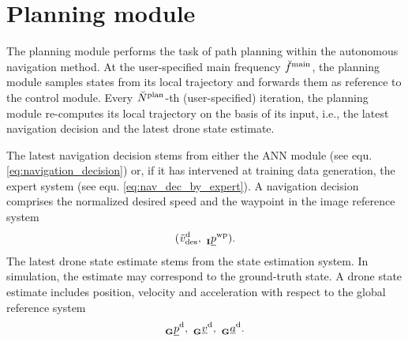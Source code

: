 \section{Planning module}
The planning module performs the task of path planning
within the autonomous navigation method.
At the user-specified main frequency 
$\freq[\user]{\main}{}{}{}$,
the planning module 
samples states from its local trajectory
and forwards them as reference to the control module.
Every $\num[\user]{\text{plan}}{}{}{}$-th (user-specified) iteration,
the planning module re-computes its local trajectory
on the basis of its input,
i.e., the latest navigation decision and the latest drone state estimate. 

The latest navigation decision
stems from either the ANN module
(see equ. \ref{eq:navigation_decision}) 
or, if it has intervened at training data generation,
the expert system (see equ. \ref{eq:nav_dec_by_expert}).
A navigation decision comprises the normalized desired speed 
and the waypoint in the image reference system
\begin{equation}
    (
        \speed[\norm]{\drone}{\desired}{}{}
        ,\ 
        \pos[]{\wayp}{}{\irs}{}
    ).
\end{equation}
The latest drone state estimate stems from the state estimation system.
In simulation, the estimate may correspond to the ground-truth state.
A drone state estimate includes position, velocity and acceleration
with respect to the global reference system
\begin{equation} \label{eq:drone_state}
    \pos[]{\drone}{}{\grs}{}
    ,\ 
    \vel[]{\drone}{}{\grs}{}
    ,\ 
    \acc[]{\drone}{}{\grs}{}.
\end{equation}


